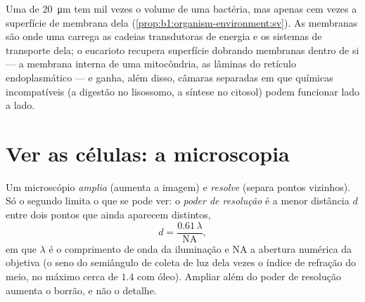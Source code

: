 \begin{example}\label{ex:b1:cell-unit-of-life:whycompart}
Uma  de \qty{20}{\micro m} tem mil vezes o volume de uma bactéria,
mas apenas cem vezes a superfície de membrana dela
(\cref{prop:b1:organism-environment:sv}). As membranas são onde uma
 carrega as cadeias transdutoras de energia e os sistemas de
transporte dela; o eucarioto recupera superfície dobrando membranas
dentro de si --- a membrana interna de uma mitocôndria, as lâminas do
retículo endoplasmático --- e ganha, além disso, câmaras separadas em
que químicas incompatíveis (a digestão no lisossomo, a síntese no
citosol) podem funcionar lado a lado.
\end{example}

\section{Ver as células: a microscopia}

\begin{definition}\label{def:b1:cell-unit-of-life:resolution}
Um microscópio \emph{amplia} (aumenta a imagem) e
\emph{resolve} (separa pontos vizinhos). Só o segundo
limita o que se pode ver: o
\emph{poder de resolução} é a menor distância
$d$ entre dois pontos que ainda aparecem distintos,
\[
d = \frac{0.61\,\lambda}{\mathrm{NA}},
\]
em que $\lambda$ é o comprimento de onda da iluminação e $\mathrm{NA}$ a
abertura numérica da objetiva (o seno do semiângulo de coleta de luz
dela vezes o índice de refração do meio, no máximo cerca de $1.4$ com
óleo). Ampliar além do poder de resolução aumenta o borrão, e não o
detalhe.
\end{definition}

